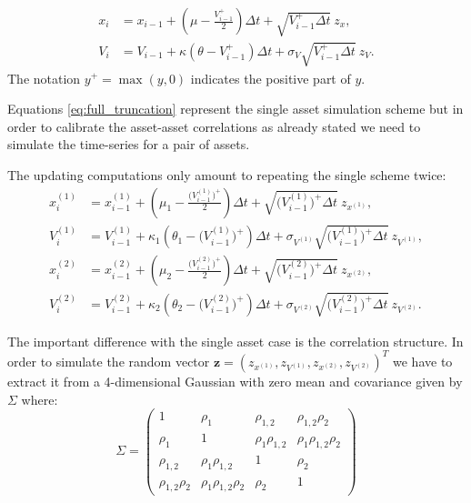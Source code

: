 \begin{subequations}
	\label{eq:full_truncation}
	\begin{align}
	x_i &= x_{i-1} + (\mu -  \frac{V_{i-1}^+}{2})\Delta t + \sqrt{V_{i-1}^+ \Delta t} \:z_x, \\
	V_i &= V_{i-1} + \kappa(\theta - V_{i-1}^+ )\Delta t + \sigma_V \sqrt{V_{i-1}^+ \Delta t} \: z_V.
	\end{align}
\end{subequations}
The notation $y^+ = \max(y, 0)$ indicates the positive part of $y$. 

Equations \eqref{eq:full_truncation} represent the single asset simulation scheme but in order to calibrate the asset-asset correlations as already stated we need to simulate the time-series for a pair of assets.

The updating computations only amount to repeating the single scheme twice:
\begin{subequations}
	\label{eq:full_truncation2}
	\begin{align}
	x_i^{(1)} &= x_{i-1}^{(1)} + (\mu_1 -  \frac{\Big(V_{i-1}^{(1)}\Big)^+}{2})\Delta t + \sqrt{\Big(V_{i-1}^{(1)}\Big)^+ \Delta t} \:z_{x^{(1)}}, \\
	V_i^{(1)} &= V_{i-1}^{(1)} + \kappa_1(\theta_1 - \Big(V_{i-1}^{(1)}\Big)^+ )\Delta t + \sigma_{V^{(1)}} \sqrt{\Big(V_{i-1}^{(1)}\Big)^+ \Delta t} \: z_{V^(1)},\\
	x_i^{(2)} &= x_{i-1}^{(2)} + (\mu_2 -  \frac{\Big(V_{i-1}^{(2)}\Big)^+}{2})\Delta t + \sqrt{\Big(V_{i-1}^{(2)}\Big)^+\Delta t} \:z_{x^{(2)}}, \\
	V_i^{(2)} &= V_{i-1}^{(2)} + \kappa_2(\theta_2 - \Big(V_{i-1}^{(2)}\Big)^+ )\Delta t + \sigma_{V^{(2)}} \sqrt{\Big(V_{i-1}^{(2)}\Big)^+ \Delta t} \: z_{V^{(2)}}.
	\end{align}
\end{subequations}

The important difference with the single asset case is the correlation structure. In order to simulate the random vector $\mathbf{z} = (z_{x^{(1)}}, z_{V^{(1)}}, z_{x^{(2)}}, z_{V^{(2)}})^T$ we have to extract it from a 4-dimensional Gaussian with zero mean and covariance given by $\Sigma$ where:
\begin{equation}
	\Sigma = \begin{pmatrix}
	1 	& \rho_1 & \rho_{1,2} & \rho_{1,2} \rho_2\\
	\rho_1 & 1 & \rho_1 \rho_{1,2} & \rho_1 \rho_{1,2} \rho_2\\
	 \rho_{1,2} & \rho_1 \rho_{1,2}  & 1 & \rho_2 \\
	 \rho_{1,2} \rho_2 & \rho_1 \rho_{1,2} \rho_2&\rho_2  & 1
	\end{pmatrix}
\end{equation}

